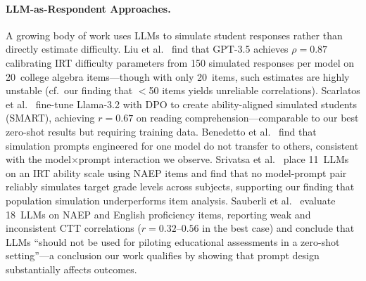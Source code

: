 

\paragraph{LLM-as-Respondent Approaches.}
A growing body of work uses LLMs to simulate student responses rather than directly estimate difficulty. Liu et al.~\cite{liu2024} find that GPT-3.5 achieves $\rho = 0.87$ calibrating IRT difficulty parameters from 150 simulated responses per model on 20~college algebra items---though with only 20~items, such estimates are highly unstable (cf.\ our finding that $<$50 items yields unreliable correlations). Scarlatos et al.~\cite{scarlatos2025} fine-tune Llama-3.2 with DPO to create ability-aligned simulated students (SMART), achieving $r = 0.67$ on reading comprehension---comparable to our best zero-shot results but requiring training data. Benedetto et al.~\cite{benedetto2024} find that simulation prompts engineered for one model do not transfer to others, consistent with the model$\times$prompt interaction we observe. Srivatsa et al.~\cite{srivatsa2025} place 11~LLMs on an IRT ability scale using NAEP items and find that no model-prompt pair reliably simulates target grade levels across subjects, supporting our finding that population simulation underperforms item analysis. Sauberli et al.~\cite{sauberli2025} evaluate 18~LLMs on NAEP and English proficiency items, reporting weak and inconsistent CTT correlations ($r = 0.32$--$0.56$ in the best case) and conclude that LLMs ``should not be used for piloting educational assessments in a zero-shot setting''---a conclusion our work qualifies by showing that prompt design substantially affects outcomes.


%
%
%
%
